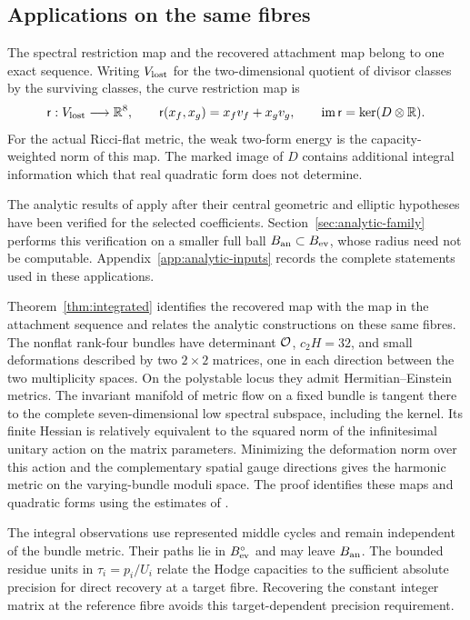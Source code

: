 \subsection{Applications on the same fibres}

The spectral restriction map and the recovered
attachment map belong to one exact sequence.
Writing $V_{\rm lost}$ for the two-dimensional
quotient of divisor classes by the surviving
classes, the curve restriction map is
\[
 \mathsf r:V_{\rm lost}\longrightarrow\mathbb R^8,\qquad
 \mathsf r(x_f,x_g)=x_fv_f+x_gv_g,\qquad
                    \operatorname{im}\mathsf r=\ker(D\otimes\mathbb R).
\]
For the actual Ricci-flat metric, the weak two-form
energy is the capacity-weighted norm of this map.
The marked image of $D$ contains additional integral
information which that real quadratic form does not
determine.

The analytic results of \cite{W_Hodge,W_HYM} apply after
their central geometric and elliptic hypotheses have been
verified for the selected coefficients. Section~\ref{sec:analytic-family}
performs this verification on a smaller full ball
$B_{\rm an}\subset B_{\rm ev}$, whose radius need not be
computable. Appendix~\ref{app:analytic-inputs} records the
complete statements used in these applications.

Theorem~\ref{thm:integrated} identifies the recovered map
with the map in the attachment sequence and relates the
analytic constructions on these same fibres. The nonflat
rank-four bundles have determinant $\mathcal O$, $c_2H=32$, and
small deformations described by two $2\times2$ matrices,
one in each direction between the two multiplicity spaces.
On the polystable locus they admit Hermitian--Einstein metrics.
The invariant manifold of metric flow on a fixed bundle is
tangent there to the complete seven-dimensional low spectral
subspace, including the kernel. Its finite Hessian is relatively
equivalent to the squared norm of the infinitesimal unitary
action on the matrix parameters. Minimizing the deformation
norm over this action and the complementary spatial gauge
directions gives the harmonic metric on the varying-bundle
moduli space. The proof identifies these maps and quadratic
forms using the estimates of \cite{W_HYM}.

The integral observations use represented middle cycles and
remain independent of the bundle metric. Their paths lie in
$B_{\rm ev}^{\circ}$ and may leave $B_{\rm an}$.
The bounded residue units in $\tau_i=p_i/U_i$ relate the
Hodge capacities to the sufficient absolute precision for
direct recovery at a target fibre. Recovering the constant
integer matrix at the reference fibre avoids this
target-dependent precision requirement.

